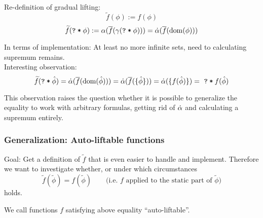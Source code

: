 \documentclass[11pt,a4paper]{article}
\newcommand{\ttt}{\texttt}
\newcommand{\dom}{\ensuremath{\textrm{dom}}}
\newcommand{\grad}[1]{\widetilde{#1}}
\newcommand{\qm}{\ttt{?}}
\newcommand{\withqm}[1]{\ttt{\qm\:*\:$#1$}}
\begin{document}
~\\
Re-definition of gradual lifting:
$$\grad{f}(\phi) := f(\phi)$$ 
$$\grad{f}(\withqm{\phi}) := \alpha(\overline{f}(\gamma(\withqm{\phi}))) = \dalpha(\overline{f}(\dom(\phi)))$$ 

In terms of implementation: At least no more infinite sets, need to calculating supremum remains.\\

Interesting observation:
$$\grad{f}(\withqm{\hat{\phi}}) = \dalpha(\overline{f}(\dom(\hat{\phi}))) = \dalpha(\overline{f}(\{ \hat{\phi} \})) = \dalpha(\{ f(\hat{\phi}) \}) = \,\,\withqm{f(\hat{\phi})}$$

This observation raises the question whether it is possible to generalize the equality to work with arbitrary formulas, getting rid of $\dot{\alpha}$ and calculating a supremum entirely.




\subsubsection{Generalization: Auto-liftable functions}
Goal:
Get a definition of $\grad{f}$ that is even easier to handle and implement.
Therefore we want to investigate whether, or under which circumstances 
$$\grad{f}(\grad{\phi}) = f(\grad{\phi}) \quad\quad\text{(i.e. $f$ applied to the static part of $\grad{\phi}$)}$$
holds.

We call functions $f$ satisfying above equality “auto-liftable”.

\end{document}
